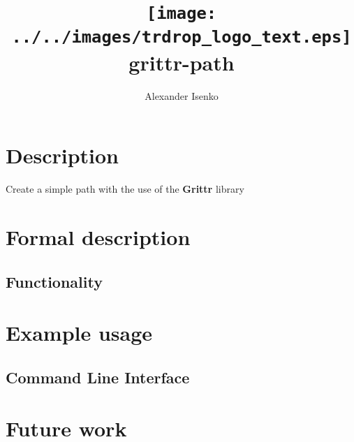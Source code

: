 \documentclass[titlepage]{article}
\title{\texttt{[image: ../../images/trdrop\_logo\_text.eps]} \\[50pt]
grittr-path}
\author{Alexander Isenko}
\date{}
\begin{document}
\maketitle

\newpage

\section{Description}
Create a simple path with the use of the \textbf{Grittr} library

\section{Formal description}


\subsection{Functionality}

\section{Example usage}

\subsection{Command Line Interface}

\section{Future work}
\end{document}
